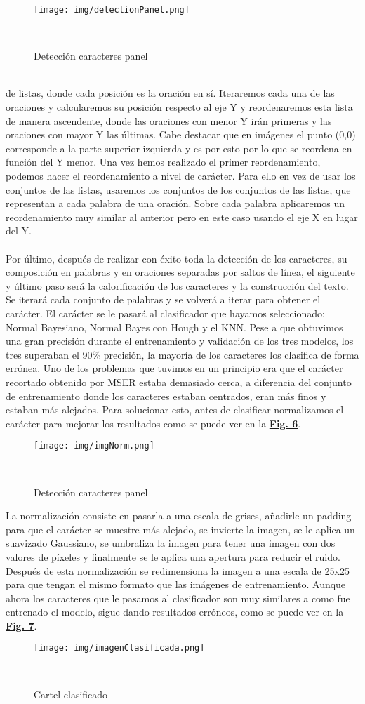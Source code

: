 \documentclass[a4paper, 12pt]{article}
\begin{document}
\begin{figure}[h]
	\centering
	\texttt{[image: img/detectionPanel.png]}
 	\caption{Detección caracteres panel}\
	\label{fig:imagenDetectada}
\end{figure}
\\de listas, donde cada posición es la oración en sí. Iteraremos cada una de las oraciones y calcularemos su posición respecto al eje Y y reordenaremos esta lista de manera ascendente, donde las oraciones con menor Y irán primeras y las oraciones con mayor Y las últimas. Cabe destacar que en imágenes el punto (0,0) corresponde a la parte superior izquierda y es por esto por lo que se reordena en función del Y menor. Una vez hemos realizado el primer reordenamiento, podemos hacer el reordenamiento a nivel de carácter. Para ello en vez de usar los conjuntos de las listas, usaremos los conjuntos de los conjuntos de las listas, que representan a cada palabra de una oración. Sobre cada palabra aplicaremos un reordenamiento muy similar al anterior pero en este caso usando el eje X en lugar del Y. 
\\\\ Por último, después de realizar con éxito toda la detección de los caracteres, su composición en palabras y en oraciones separadas por saltos de línea, el siguiente y último paso será la calorificación de los caracteres y la construcción del texto. Se iterará cada conjunto de palabras y se volverá a iterar para obtener el carácter. El carácter se le pasará al clasificador que hayamos seleccionado: Normal Bayesiano, Normal Bayes con Hough y el KNN. Pese a que obtuvimos una gran precisión durante el entrenamiento y validación de los tres modelos, los tres superaban el 90\% precisión, la mayoría de los caracteres los clasifica de forma errónea. Uno de los problemas que tuvimos en un principio era que el carácter recortado obtenido por MSER estaba demasiado cerca, a diferencia del conjunto de entrenamiento donde los caracteres estaban centrados, eran más finos y estaban más alejados. Para solucionar esto, antes de clasificar normalizamos el carácter para mejorar los resultados como se puede ver en la \textbf{\hyperref[fig:imagenDetectada]{Fig. 6}}.
\newpage
\begin{figure}[h]
	\centering
	\texttt{[image: img/imgNorm.png]}
 	\caption{Detección caracteres panel}\
	\label{fig:imagenDetectada}
\end{figure}
La normalización consiste en pasarla a una escala de grises, añadirle un padding para que el carácter se muestre más alejado, se invierte la imagen, se le aplica un suavizado Gaussiano, se umbraliza la imagen para tener una imagen con dos valores de píxeles y finalmente se le aplica una apertura para reducir el ruido. Después de esta normalización se redimensiona la imagen a una escala de 25x25 para que tengan el mismo formato que las imágenes de entrenamiento. Aunque ahora los caracteres que le pasamos al clasificador son muy similares a como fue entrenado el modelo, sigue dando resultados erróneos, como se puede ver en la \textbf{\hyperref[fig:imagenClasificada]{Fig. 7}}.

\begin{figure}[h]
	\centering
	\texttt{[image: img/imagenClasificada.png]}
 	\caption{Cartel clasificado}\
	\label{fig:imagenClasificada}
\end{figure}
\end{document}
